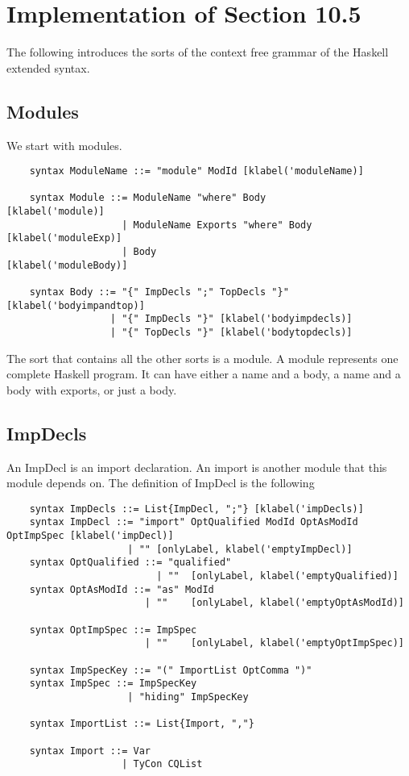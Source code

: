 \section{Implementation of Section 10.5}
The following introduces the sorts of the context free grammar of the Haskell extended syntax.

\subsection{Modules}
We start with modules.
\begin{lstlisting}
    syntax ModuleName ::= "module" ModId [klabel('moduleName)]

    syntax Module ::= ModuleName "where" Body          [klabel('module)]
                    | ModuleName Exports "where" Body  [klabel('moduleExp)]
                    | Body                             [klabel('moduleBody)]

    syntax Body ::= "{" ImpDecls ";" TopDecls "}" [klabel('bodyimpandtop)]
                  | "{" ImpDecls "}" [klabel('bodyimpdecls)]
                  | "{" TopDecls "}" [klabel('bodytopdecls)]
\end{lstlisting}

The sort that contains all the other sorts is a module. A module represents one complete Haskell program. It can have either a name and a body, a name and a body with exports, or just a body.

\subsection{ImpDecls}
An ImpDecl is an import declaration. An import is another module that this module depends on.
The definition of ImpDecl is the following
\begin{lstlisting}
    syntax ImpDecls ::= List{ImpDecl, ";"} [klabel('impDecls)]
    syntax ImpDecl ::= "import" OptQualified ModId OptAsModId OptImpSpec [klabel('impDecl)]
                     | "" [onlyLabel, klabel('emptyImpDecl)]
    syntax OptQualified ::= "qualified"
                          | ""  [onlyLabel, klabel('emptyQualified)]
    syntax OptAsModId ::= "as" ModId
                        | ""    [onlyLabel, klabel('emptyOptAsModId)]

    syntax OptImpSpec ::= ImpSpec
                        | ""    [onlyLabel, klabel('emptyOptImpSpec)]

    syntax ImpSpecKey ::= "(" ImportList OptComma ")"
    syntax ImpSpec ::= ImpSpecKey
                     | "hiding" ImpSpecKey

    syntax ImportList ::= List{Import, ","}

    syntax Import ::= Var
                    | TyCon CQList
\end{lstlisting}

